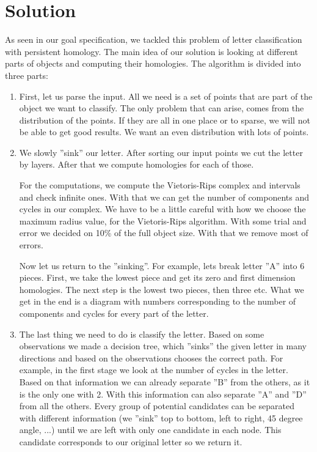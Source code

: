 \documentclass{article}
\begin{document}

\section{Solution}
As seen in our goal specification, we tackled this problem of letter classification with persistent homology. 
The main idea of our solution is looking at different parts of objects and computing their homologies. The 
algorithm is divided into three parts:

\begin{enumerate}
\item First, let us parse the input. All we need is a set of points that are part of the object we want to classify. The
only problem that can arise, comes from the distribution of the points. If they are all in one place or to sparse, we
will not be able to get good results. We want an even distribution with lots of points.

\item We slowly ''sink'' our letter. After sorting our input points we cut the letter by layers. After that we compute 
homologies for each of those. 

For the computations, we compute the Vietoris-Rips complex and intervals and check infinite ones. With that we can get the number of components and cycles in our complex.
We have to be a little careful with how we choose the maximum radius value, for the Vietoris-Rips algorithm. With some
trial and error we decided on 10\% of the full object size. With that we remove most of errors. 

Now let us return to the ''sinking''. For example, lets break letter ''A'' into 6 pieces. First, we take the lowest piece and 
get its zero and first dimension homologies. The next step is the lowest two pieces, then three etc. What we get in the end is a diagram with numbers corresponding to the number of components and cycles for every part of the letter.

\item The last thing we need to do is classify the letter. Based on some observations we made a decision tree, which ''sinks'' the given letter in many directions and based on the observations chooses the correct path. For example, in the first stage we look at the number of cycles in the letter. Based on that information we can already separate ''B'' from the others, as it is the only one with 2. With this information can also separate ''A'' and ''D'' from all the others. Every group of potential candidates can be separated with different information (we ''sink'' top to bottom, left to right, 45 degree angle, ...) until we are left with only one candidate in each node. This candidate corresponds to our original letter so we return it. 

\end{enumerate}
\end{document}
